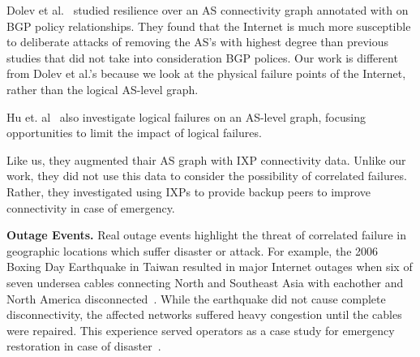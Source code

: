     Dolev et al.~\cite{resilience-under-BGP} studied resilience over an AS connectivity graph annotated with
    on BGP policy relationships. They found that the Internet
    is much more susceptible to 
 deliberate attacks of removing the AS's with
    highest degree than previous studies that did not take into consideration
    BGP polices. Our work is different from Dolev et al.'s because we look at
    the physical failure points of the Internet, rather than the logical
    AS-level graph.
    
    Hu et. al~\cite{ixp-routingdiversity} also investigate logical failures on
    an AS-level graph, focusing opportunities to limit the impact of logical
    failures.

    Like us, they augmented thair AS graph with IXP connectivity data.  Unlike
    our work, they did not use this data to consider the possibility of
    correlated failures.  Rather, they investigated using IXPs to provide
    backup peers to improve connectivity in case of emergency.

{\bf Outage Events.}  Real outage events highlight the threat of correlated
    failure in geographic locations which suffer disaster or attack.  For
    example, the 2006 Boxing Day Earthquake in Taiwan resulted in major
    Internet outages when six of seven undersea cables connecting North and
    Southeast Asia with eachother and North America
    disconnected~\cite{asia-comm-quake}.  While the earthquake did not cause
    complete disconnectivity, the affected networks suffered heavy congestion
    until the cables were repaired.  This experience served operators as a case
    study for emergency restoration in case of disaster~\cite{taiwan}.
       


